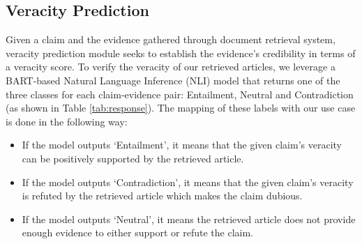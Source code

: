 \documentclass[11pt]{article}
\begin{document}




\subsection{Veracity Prediction}
Given a claim and the evidence gathered through document retrieval system, veracity prediction module seeks to establish the evidence's credibility in terms of a veracity score. To verify the veracity of our retrieved articles, we leverage a BART-based \cite{lewis-etal-2020-bart} Natural Language Inference (NLI) model that returns one of the three classes for each claim-evidence pair: Entailment, Neutral and Contradiction (as shown in Table \ref{tab:response}). The mapping of these labels with our use case is done in the following way:
\begin{itemize}
    \item If the model outputs `Entailment', it means that the given claim's veracity can be positively supported by the retrieved article.
    \item If the model outputs `Contradiction', it means that the given claim's veracity is refuted by the retrieved article which makes the claim dubious.
    \item If the model outputs `Neutral', it means the retrieved article does not provide enough evidence to either support or refute the claim.
\end{itemize}
\end{document}
